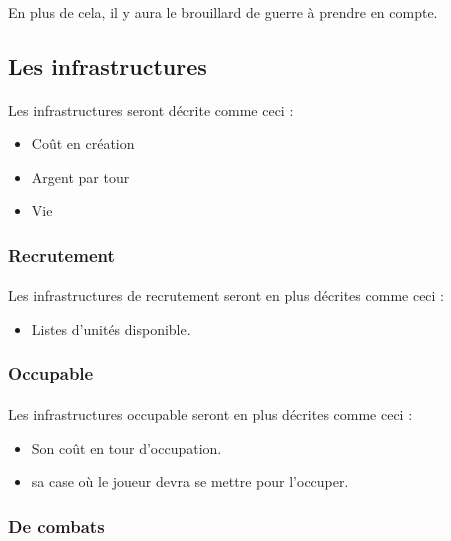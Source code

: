\paragraph{} En plus de cela, il y aura le brouillard de guerre à prendre en compte.

\subsection{Les infrastructures}

\paragraph{} Les infrastructures seront décrite comme ceci :
\begin{itemize}
	\item Coût en création
	\item Argent par tour
	\item Vie
\end{itemize}

\subsubsection{Recrutement}

\paragraph{} Les infrastructures de recrutement seront en plus décrites comme ceci :
\begin{itemize}
	\item Listes d'unités disponible.
\end{itemize}

\subsubsection{Occupable}
\paragraph{} Les infrastructures occupable seront en plus décrites comme ceci :
\begin{itemize}
	\item Son coût en tour d'occupation.
	\item sa case où le joueur devra se mettre pour l'occuper.
\end{itemize}

\subsubsection{De combats}
